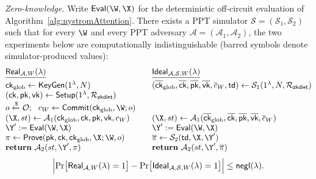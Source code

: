 \documentclass[runningheads]{llncs}
\begin{document}
\noindent\emph{Zero-knowledge.}
Write $\mathsf{Eval}(\W, \X)$ for the deterministic off-circuit evaluation of Algorithm~\ref{alg:nystromAttention}. There exists a PPT simulator $\mathcal{S} = (\mathcal{S}_{1}, \mathcal{S}_{2})$ such that for every $\W$ and every PPT adversary $\mathcal{A} = (\mathcal{A}_{1}, \mathcal{A}_{2})$, the two experiments below are computationally indistinguishable (barred symbols denote simulator-produced values):
\[
\begin{array}{@{}l@{\qquad}l@{}}
\underline{\mathsf{Real}_{\mathcal{A}, W}(\lambda)} &
\underline{\mathsf{Ideal}_{\mathcal{A}, \mathcal{S}, W}(\lambda)} \\[4pt]
\mathsf{ck}_{\mathrm{glob}} \leftarrow \mathsf{KeyGen}(1^{\lambda}, N) &
(\overline{\mathsf{ck}}_{\mathrm{glob}}, \overline{\mathsf{ck}},
 \overline{\mathsf{pk}}, \overline{\mathsf{vk}}, \overline{c}_{W},
 \mathsf{td}) \leftarrow
 \mathcal{S}_{1}(1^{\lambda}, N, \mathcal{R}_{\mathsf{zkdiet}}) \\
(\mathsf{ck}, \mathsf{pk}, \mathsf{vk}) \leftarrow
 \mathsf{Setup}(1^{\lambda}, \mathcal{R}_{\mathsf{zkdiet}}) & \\
o \xleftarrow{\$} \mathcal{O};\ \
 c_{W} \leftarrow \mathsf{Commit}(\mathsf{ck}_{\mathrm{glob}}, \W; o) & \\
(\X, st) \leftarrow \mathcal{A}_{1}(\mathsf{ck}_{\mathrm{glob}},
 \mathsf{ck}, \mathsf{pk}, \mathsf{vk}, c_{W}) &
(\X, st) \leftarrow
 \mathcal{A}_{1}(\overline{\mathsf{ck}}_{\mathrm{glob}},
 \overline{\mathsf{ck}}, \overline{\mathsf{pk}},
 \overline{\mathsf{vk}}, \overline{c}_{W}) \\
\Y' := \mathsf{Eval}(\W, \X) &
\Y' := \mathsf{Eval}(\W, \X) \\
\pi \leftarrow \mathsf{Prove}(\mathsf{pk}, \mathsf{ck},
 \mathsf{ck}_{\mathrm{glob}}, \X; \W, o) &
\overline{\pi} \leftarrow \mathcal{S}_{2}(\mathsf{td}, \X,
 \Y') \\
\mathbf{return}\ \mathcal{A}_{2}(st, \Y', \pi) &
\mathbf{return}\ \mathcal{A}_{2}(st, \Y', \overline{\pi})
\end{array}
\]
\[
\Bigl| \Pr\bigl[\mathsf{Real}_{\mathcal{A}, W}(\lambda) = 1\bigr] -
       \Pr\bigl[\mathsf{Ideal}_{\mathcal{A}, \mathcal{S}, W}(\lambda) = 1\bigr]
\Bigr| \le \mathsf{negl}(\lambda).
\]
\end{document}
